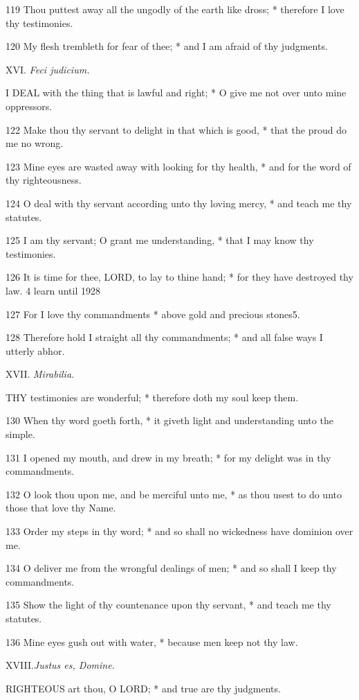 119 Thou puttest away all the ungodly of the earth
like dross; * therefore I love thy testimonies.

120 My flesh trembleth for fear of thee; * and I am
afraid of thy judgments.

XVI.
\emph{Feci judicium.}

I
DEAL with the thing that is lawful and right; * O give me not over unto
mine oppressors.

122 Make thou thy servant to delight in that which
is good, * that the proud do me no wrong.

123 Mine eyes are wasted away with looking for thy
health, * and for the word of thy righteousness.

124 O deal with thy servant according unto thy loving
mercy, * and teach me thy statutes.

125 I am thy servant; O grant me understanding, * that
I may know thy testimonies.

126 It is time for thee, LORD, to lay to thine hand;
* for they have destroyed thy law. 4
learn until
1928

127 For I love thy commandments * above gold and precious stones5.

128 Therefore hold I straight all thy commandments;
* and all false ways I utterly abhor.

XVII.
\emph{Mirabilia.}

THY
testimonies are wonderful; * therefore doth my soul keep them.

130 When thy word goeth forth, * it giveth light and
understanding unto the simple.

131 I opened my mouth, and drew in my breath; * for
my delight was in thy commandments.

132 O look thou upon me, and be merciful unto me, *
as thou usest to do unto those that love thy Name.

133 Order my steps in thy word; * and so shall no wickedness
have dominion over me.

134 O deliver me from the wrongful dealings of men;
* and so shall I keep thy commandments.

135 Show the light of thy countenance upon thy servant,
* and teach me thy statutes.

136 Mine eyes gush out with water, * because men keep
not thy law.

XVIII.\emph{Justus es, Domine.}

RIGHTEOUS
art thou, O LORD; * and true are thy judgments.

